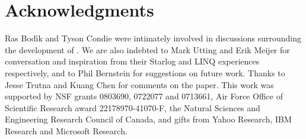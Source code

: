 \section{Acknowledgments}
Ras Bod\'{\i}k and Tyson Condie were intimately involved in discussions
surrounding the development of \lang.  We are also indebted to Mark Utting and
Erik Meijer for conversation and inspiration from their Starlog and LINQ
experiences respectively, and to Phil Bernstein for suggestions on future work.
Thanks to Jesse Trutna and Kuang Chen for comments on the paper. This work was
supported by NSF grants 0803690, 0722077 and 0713661, Air Force Office of
Scientific Research award 22178970-41070-F, the Natural Sciences and Engineering
Research Council of Canada, and gifts from Yahoo Research, IBM Research and
Microsoft Research.
